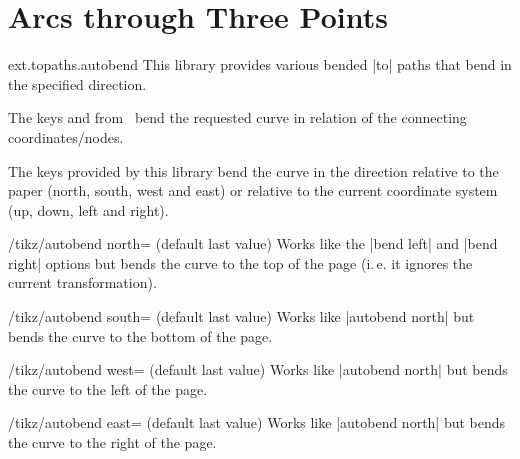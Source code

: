 %
%
%

\section{Arcs through Three Points}
\label{library:topaths.autobend}
\begin{tikzlibrary}{ext.topaths.autobend}
  This library provides various bended |to| paths
  that bend in the specified direction.
  
\end{tikzlibrary}

The keys 
and  from \tikzname\ 
bend the requested curve in relation of the connecting
coordinates/nodes.

The keys provided by this library bend the curve in the direction relative
to the paper (north, south, west and east) or relative to the current
coordinate system (up, down, left and right).

\begin{key}{/tikz/autobend north= (default \normalfont last value)}
  Works like the |bend left| and |bend right| options
  but bends the curve to the top of the page (i.\,e. it ignores the current transformation).
\end{key}
\begin{key}{/tikz/autobend south= (default \normalfont last value)}
  Works like |autobend north| but bends the curve to the bottom of the page.
\end{key}
\begin{key}{/tikz/autobend west= (default \normalfont last value)}
  Works like |autobend north| but bends the curve to the left of the page.
\end{key}
\begin{key}{/tikz/autobend east= (default \normalfont last value)}
  Works like |autobend north| but bends the curve to the right of the page.
\end{key}

